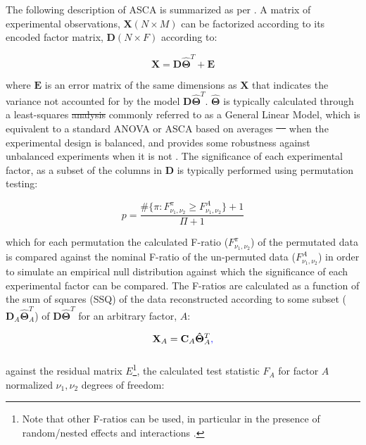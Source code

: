 \documentclass[preprint,12pt]{elsarticle}
\providecommand{\DIFadd}[1]{{\protect\color{blue}\uwave{#1}}} %
\providecommand{\DIFdel}[1]{{\protect\color{red}\sout{#1}}}                      %
\providecommand{\DIFaddbegin}{} %
\providecommand{\DIFaddend}{} %
\providecommand{\DIFdelbegin}{} %
\providecommand{\DIFdelend}{} %
\begin{document}
The following description of ASCA is summarized as per \cite{camacho2023permutation}. A matrix of experimental observations, $\mathbf{X} (N \times M)$ can be factorized according to its encoded factor matrix, $\mathbf{D} (N \times F)$ according to:

\begin{equation}
    \mathbf{X} = \mathbf{D} \mathbf{\hat{\Theta}}^T + \mathbf{E}
\end{equation}

\noindent where $\mathbf{E}$ is an error matrix of the same dimensions as $\mathbf{X}$ that indicates the variance not accounted for by the model $\mathbf{D} \mathbf{\hat{\Theta}}^T$. $\mathbf{\hat{\Theta}}$ is typically calculated through a least-squares \DIFdelbegin \DIFdel{analysis }\DIFdelend \DIFaddbegin \DIFadd{regression }\DIFaddend commonly referred to as a General Linear Model, which is equivalent to a standard ANOVA or ASCA based on averages \DIFdelbegin \DIFdel{\mbox{%
\cite{smilde2005anova} }\hskip0pt%
}\DIFdelend when the experimental design is balanced, and provides some robustness against unbalanced experiments when it is not \DIFaddbegin \DIFadd{\mbox{%
\cite{smilde2005anova}}\hskip0pt%
}\DIFaddend . The significance of each experimental factor, as a subset of the columns in $\mathbf{D}$ is typically performed using permutation testing:

\begin{equation}
p = \frac{\#\{\pi:F^\pi_{\nu_1,\nu_2} \geq F^{A}_{\nu_1,\nu_2}\} + 1}{\Pi+1}
\end{equation}

\noindent which for each permutation the calculated F-ratio ($F^\pi_{\nu_1,\nu_2}$) of the permutated data is compared against the nominal F-ratio of the un-permuted data ($F^{A}_{\nu_1,\nu_2}$) in order to simulate an empirical null distribution against which the significance of each experimental factor can be compared. The F-ratios are calculated as a function of the sum of squares (SSQ) of the data reconstructed according to some subset ($\mathbf{D}_A\mathbf{\hat{\Theta}}_A^T$) of $\mathbf{D}\mathbf{\hat{\Theta}}^T$ for an arbitrary factor, $A$:

\begin{equation}\DIFaddbegin \label{eq:rec}
    \DIFaddend \mathbf{X}_A = \mathbf{C}_A\mathbf{\hat{\Theta}}^T_A\DIFaddbegin \DIFadd{,
}\DIFaddend \end{equation}

\noindent against the residual matrix $E$\footnote{Note that other F-ratios can be used, in particular in the presence of random/nested effects and interactions \cite{anderson2014permutational}.}, the calculated test statistic $F_A$ for factor $A$ normalized $\nu_1, \nu_2$ degrees of freedom:
\end{document}
